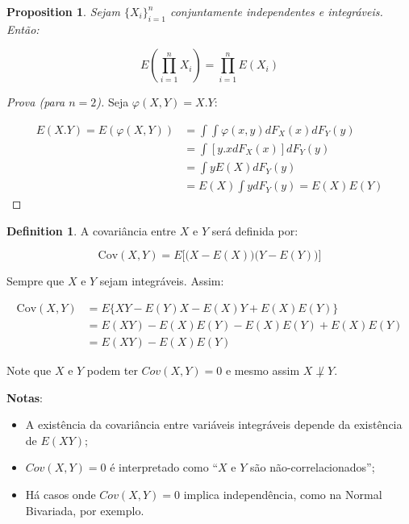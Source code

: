 \documentclass[
]{article}
\providecommand{\tightlist}{%
  \setlength{\itemsep}{0pt}\setlength{\parskip}{0pt}}
\newtheorem{proposition}{Proposition}[section]
\theoremstyle{definition}
\newtheorem{definition}{Definition}[section]
\theoremstyle{definition}
\theoremstyle{definition}
\theoremstyle{definition}
\theoremstyle{remark}
\begin{document}
\begin{proposition}
Sejam \(\{X_{i}\}_{i=1}^{n}\) conjuntamente independentes e integráveis. Então:

\begin{equation*}
E\left(\prod_{i=1}^{n}X_{i}\right) = \prod_{i=1}^{n}E(X_{i})
\end{equation*}
\end{proposition}

\begin{proof}[Prova (para $n = 2$)]
Seja \(\varphi(X,Y) = X.Y\):

\begin{align*}
E(X.Y) = E(\varphi(X,Y)) &= \int \int \varphi(x,y)dF_{X}(x)dF_{Y}(y) \\
&= \int[y.xdF_{X}(x)]dF_{Y}(y) \\
&= \int yE(X)dF_{Y}(y) \\
&= E(X)\int ydF_{Y}(y) = E(X)E(Y)
\end{align*}
\end{proof}

\begin{definition}
A covariância entre \(X\) e \(Y\) será definida por:

\begin{equation*}
\mathrm{Cov}(X,Y) = E\Big[\big(X - E(X)\big)\big(Y - E(Y)\big)\Big]
\end{equation*}

Sempre que \(X\) e \(Y\) sejam integráveis. Assim:

\begin{align*}
\mathrm{Cov}(X,Y) &= E\{XY - E(Y)X - E(X)Y + E(X)E(Y)\} \\
&= E(XY) - E(X)E(Y) - E(X)E(Y) + E(X)E(Y) \\
&= E(XY) - E(X)E(Y)
\end{align*}

Note que \(X\) e \(Y\) podem ter \(Cov(X,Y) = 0\) e mesmo assim \(X \not\perp Y\).
\end{definition}

\textbf{Notas}:

\begin{itemize}
\tightlist
\item
  A existência da covariância entre variáveis integráveis depende da existência de \(E(XY)\);
\item
  \(Cov(X,Y) = 0\) é interpretado como ``\(X\) e \(Y\) são não-correlacionados'';
\item
  Há casos onde \(Cov(X,Y) = 0\) implica independência, como na Normal Bivariada, por exemplo.
\end{itemize}
\end{document}
